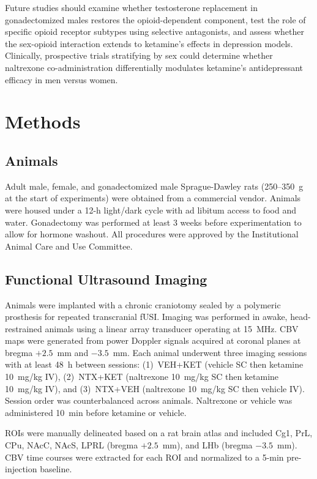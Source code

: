\documentclass[11pt]{article}
\begin{document}
Future studies should examine whether testosterone replacement in gonadectomized males restores the opioid-dependent component, test the role of specific opioid receptor subtypes using selective antagonists, and assess whether the sex-opioid interaction extends to ketamine's effects in depression models. Clinically, prospective trials stratifying by sex could determine whether naltrexone co-administration differentially modulates ketamine's antidepressant efficacy in men versus women.

\section{Methods}

\subsection{Animals}

Adult male, female, and gonadectomized male Sprague-Dawley rats (250--350~g at the start of experiments) were obtained from a commercial vendor. Animals were housed under a 12-h light/dark cycle with ad libitum access to food and water. Gonadectomy was performed at least 3 weeks before experimentation to allow for hormone washout. All procedures were approved by the Institutional Animal Care and Use Committee.

\subsection{Functional Ultrasound Imaging}

Animals were implanted with a chronic craniotomy sealed by a polymeric prosthesis for repeated transcranial fUSI. Imaging was performed in awake, head-restrained animals using a linear array transducer operating at 15~MHz. CBV maps were generated from power Doppler signals acquired at coronal planes at bregma $+2.5$~mm and $-3.5$~mm. Each animal underwent three imaging sessions with at least 48~h between sessions: (1)~VEH+KET (vehicle SC then ketamine 10~mg/kg IV), (2)~NTX+KET (naltrexone 10~mg/kg SC then ketamine 10~mg/kg IV), and (3)~NTX+VEH (naltrexone 10~mg/kg SC then vehicle IV). Session order was counterbalanced across animals. Naltrexone or vehicle was administered 10~min before ketamine or vehicle.

ROIs were manually delineated based on a rat brain atlas and included Cg1, PrL, CPu, NAcC, NAcS, LPRL (bregma $+2.5$~mm), and LHb (bregma $-3.5$~mm). CBV time courses were extracted for each ROI and normalized to a 5-min pre-injection baseline.
\end{document}
